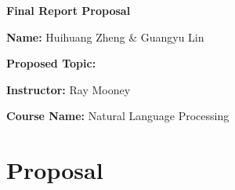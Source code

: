 \documentclass[12pt]{article}
\begin{document}
\thispagestyle{empty}

\bigskip
\bigskip

\centerline{\textbf{\Large{Final Report Proposal}}}

\bigskip
\bigskip


\noindent \textbf{Name:} %
Huihuang Zheng \&
Guangyu Lin

\bigskip


\noindent \textbf{Proposed Topic:} %

\bigskip

\noindent \textbf{Instructor:} %
Ray Mooney

\bigskip
\noindent \textbf{Course Name:}  
Natural Language Processing

\bigskip 

\section*{Proposal}

\bigskip

\begin{thebibliography}{99}


\end{thebibliography}






\end{document}
